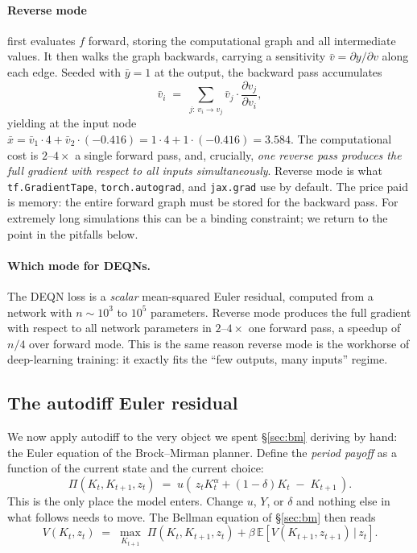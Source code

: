 \documentclass[11pt,a4paper]{report}
\begin{document}
\paragraph{Reverse mode} first evaluates $f$ forward, storing the computational graph and all intermediate values.  It then walks the graph backwards, carrying a sensitivity $\bar v = \partial y / \partial v$ along each edge.  Seeded with $\bar y = 1$ at the output, the backward pass accumulates
\[
\bar v_i \;=\; \sum_{j:\, v_i \to v_j} \bar v_j \cdot \frac{\partial v_j}{\partial v_i},
\]
yielding at the input node $\bar x = \bar v_1 \cdot 4 + \bar v_2 \cdot (-0.416) = 1\cdot 4 + 1\cdot(-0.416) = 3.584$.  The computational cost is $2$--$4\times$ a single forward pass, and, crucially, \emph{one reverse pass produces the full gradient with respect to all inputs simultaneously}.  Reverse mode is what \texttt{tf.GradientTape}, \texttt{torch.autograd}, and \texttt{jax.grad} use by default.  The price paid is memory: the entire forward graph must be stored for the backward pass.  For extremely long simulations this can be a binding constraint; we return to the point in the pitfalls below.

\paragraph{Which mode for DEQNs.}  The DEQN loss is a \emph{scalar} mean-squared Euler residual, computed from a network with $n \sim 10^3$ to $10^5$ parameters.  Reverse mode produces the full gradient with respect to all network parameters in $2$--$4\times$ one forward pass, a speedup of $n/4$ over forward mode.  This is the same reason reverse mode is the workhorse of deep-learning training: it exactly fits the ``few outputs, many inputs'' regime.

\subsection{The autodiff Euler residual}
\label{sec:ad_euler}

We now apply autodiff to the very object we spent \S\ref{sec:bm} deriving by hand: the Euler equation of the Brock--Mirman planner.  Define the \emph{period payoff} as a function of the current state and the current choice:
\begin{equation}
\Pi(K_t, K_{t+1}, z_t) \;=\; u\!\left(\,z_t K_t^{\alpha} + (1-\delta)K_t \;-\; K_{t+1}\,\right).
\label{eq:ad_pi}
\end{equation}
This is the only place the model enters.  Change $u$, $Y$, or $\delta$ and nothing else in what follows needs to move.  The Bellman equation of \S\ref{sec:bm} then reads
\begin{equation}
V(K_t, z_t) \;=\; \max_{K_{t+1}}\;\Pi(K_t, K_{t+1}, z_t) + \beta\,\mathbb{E}\!\left[V(K_{t+1}, z_{t+1})\,\big|\,z_t\right].
\end{equation}
\end{document}
